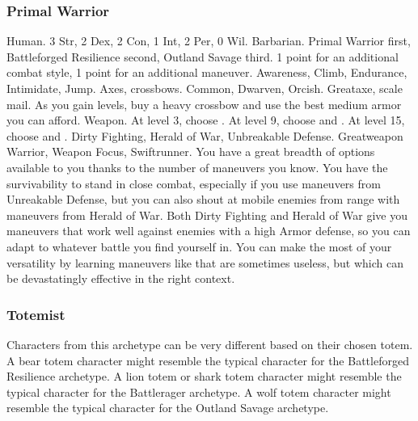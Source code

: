         \subsubsection{Primal Warrior}
             Human.
             3 Str, 2 Dex, 2 Con, 1 Int, 2 Per, 0 Wil.
             Barbarian.
             Primal Warrior first, Battleforged Resilience second, Outland Savage third.
             1 point for an additional combat style, 1 point for an additional maneuver.
             Awareness, Climb, Endurance, Intimidate, Jump.
             Axes, crossbows.
             Common, Dwarven, Orcish.
             Greataxe, scale mail. As you gain levels, buy a heavy crossbow and use the best medium armor you can afford.
             Weapon.
                At level 3, choose .
                At level 9, choose  and .
                At level 15, choose  and .
             Dirty Fighting, Herald of War, Unbreakable Defense.
             Greatweapon Warrior, Weapon Focus, Swiftrunner.
             You have a great breadth of options available to you thanks to the number of maneuvers you know.
            You have the survivability to stand in close combat, especially if you use maneuvers from Unreakable Defense, but you can also shout at mobile enemies from range with maneuvers from Herald of War.
            Both Dirty Fighting and Herald of War give you maneuvers that work well against enemies with a high Armor defense, so you can adapt to whatever battle you find yourself in.
            You can make the most of your versatility by learning maneuvers like  that are sometimes useless, but which can be devastatingly effective in the right context.

        \subsubsection{Totemist}
            Characters from this archetype can be very different based on their chosen totem.
            A bear totem character might resemble the typical character for the Battleforged Resilience archetype.
            A lion totem or shark totem character might resemble the typical character for the Battlerager archetype.
            A wolf totem character might resemble the typical character for the Outland Savage archetype.

